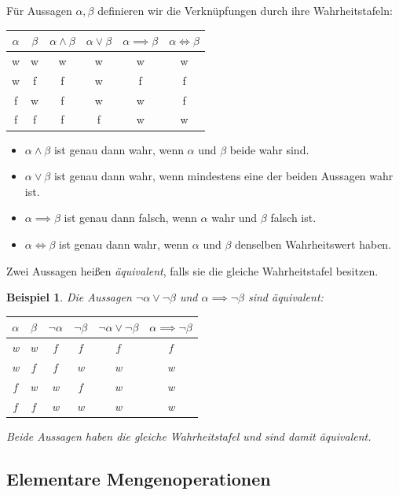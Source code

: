 \documentclass[a4paper]{article}
\theoremstyle{kurzskript}
\newtheorem*{bsp}{Beispiel}
\begin{document}
Für Aussagen $\alpha, \beta$ definieren wir die Verknüpfungen durch ihre Wahrheitstafeln:
\begin{center}
\begin{tabular}{cc|c|c|c|c}
$\alpha$ & $\beta$ & $\alpha \land \beta$ & $\alpha \lor \beta$ & $\alpha \implies \beta$ & $\alpha \iff \beta$\\\hline
w & w & w & w & w & w\\
w & f & f & w & f & f\\
f & w & f & w & w & f\\
f & f & f & f & w & w
\end{tabular}
\end{center}

\begin{itemize}
  \item $\alpha \land \beta$ ist genau dann wahr, wenn $\alpha$ und $\beta$ beide wahr sind.
  \item $\alpha \lor \beta$ ist genau dann wahr, wenn mindestens eine der beiden Aussagen wahr ist.
  \item $\alpha \implies \beta$ ist genau dann falsch, wenn $\alpha$ wahr und $\beta$ falsch ist.
  \item $\alpha \iff \beta$ ist genau dann wahr, wenn $\alpha$ und $\beta$ denselben Wahrheitswert haben.
\end{itemize}

Zwei Aussagen heißen \emph{äquivalent}, falls sie die gleiche Wahrheitstafel besitzen.

\begin{bsp}
Die Aussagen $\neg\alpha \lor \neg\beta$ und $\alpha \implies \neg\beta$ sind äquivalent:
\begin{center}
\begin{tabular}{cc|cc|c|c}
$\alpha$ & $\beta$ & $\neg\alpha$ & $\neg\beta$ & $\neg\alpha \lor \neg\beta$ & $\alpha \implies \neg\beta$\\\hline
w & w & f & f & f & f\\
w & f & f & w & w & w\\
f & w & w & f & w & w\\
f & f & w & w & w & w
\end{tabular}
\end{center}
Beide Aussagen haben die gleiche Wahrheitstafel und sind damit äquivalent.
\end{bsp}

\subsection{Elementare Mengenoperationen}
\end{document}
